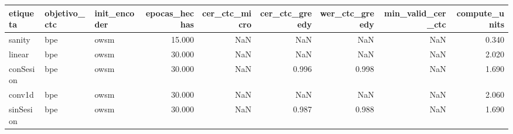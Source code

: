 \begin{tabular}{lllrrrrrr}
\toprule
etiqueta & objetivo_ctc & init_encoder & epocas_hechas & cer_ctc_micro & cer_ctc_greedy & wer_ctc_greedy & min_valid_cer_ctc & compute_units \\
\midrule
sanity & bpe & owsm & 15.000 & NaN & NaN & NaN & NaN & 0.340 \\
linear & bpe & owsm & 30.000 & NaN & NaN & NaN & NaN & 2.020 \\
conSesion & bpe & owsm & 30.000 & NaN & 0.996 & 0.998 & NaN & 1.690 \\
conv1d & bpe & owsm & 30.000 & NaN & NaN & NaN & NaN & 2.060 \\
sinSesion & bpe & owsm & 30.000 & NaN & 0.987 & 0.988 & NaN & 1.690 \\
\bottomrule
\end{tabular}
